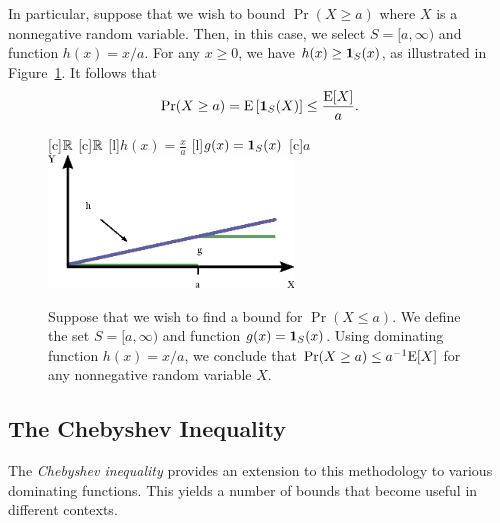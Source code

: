 In particular, suppose that we wish to bound $\Pr (X \geq a)$ where $X$ is a nonnegative random variable.
Then, in this case, we select $S = [a, \infty)$ and function $h(x) = x/a$.
For any $x \geq 0$, we have $h(x) \geq \mathbf{1}_S(x)$, as illustrated in Figure~\ref{figure:MarkovInequality}.
It follows that
\begin{equation*}
\Pr (X \geq a) = \mathrm{E} \left[ \mathbf{1}_S(X) \right] \leq \frac{\mathrm{E} [X]}{a} .
\end{equation*}

\begin{figure}[thb]
\begin{center}
\begin{psfrags}
[c]{$\mathbb{R}$}
[c]{$\mathbb{R}$}
[l]{$h(x) = \frac{x}{a}$}
[l]{$g(x) = \mathbf{1}_S (x)$}
[c]{$a$}
\includegraphics[width=6.5cm]{Figures/10Chapter/Markov}
\end{psfrags}
\caption{Suppose that we wish to find a bound for $\Pr (X \leq a)$.
We define the set $S = [a, \infty)$ and function $g(x) = \mathbf{1}_S (x)$.
Using dominating function $h(x) = x/a$, we conclude that $\Pr(X \geq a) \leq a^{-1} \mathrm{E} [X]$ for any nonnegative random variable $X$.}
\label{figure:MarkovInequality}
\end{center}
\end{figure}


\subsection{The Chebyshev Inequality}

The \emph{Chebyshev inequality} provides an extension to this methodology to various dominating functions. 
This yields a number of bounds that become useful in different contexts.


